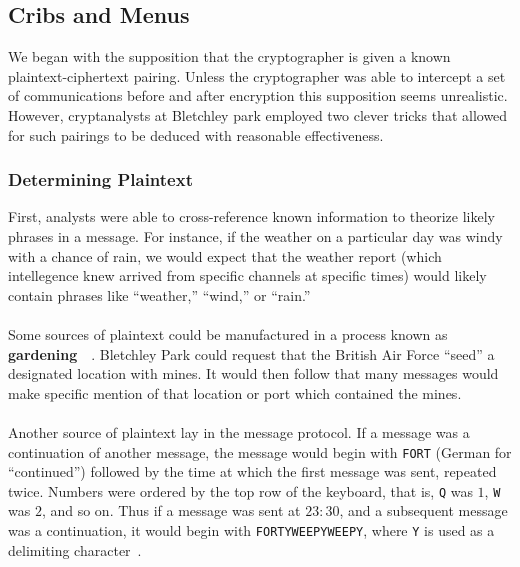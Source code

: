 \subsection{Cribs and Menus}

We began with the supposition that the
cryptographer is given a known plaintext-ciphertext pairing. Unless
the cryptographer was able to intercept
a set of communications before and after encryption this supposition
seems unrealistic. However, cryptanalysts at Bletchley park
employed two clever tricks that allowed for such pairings to be
deduced with reasonable effectiveness.
\subsubsection{Determining Plaintext}
First, analysts were able to cross-reference known information to
theorize likely phrases in a
message. For instance, if the weather on a particular day was windy
with a chance of rain, we would expect that the weather report (which
intellegence knew arrived from specific channels at specific times)
would likely contain phrases like ``weather,'' ``wind,'' or ``rain.''
\\\\Some sources of plaintext could be manufactured in a process
known as {\bf{gardening}}~\cite[p.~187]{sebag-montefiore2000enigma}~\cite[p.~144]{kahn1991seizing}. Bletchley Park could request that the
British Air Force ``seed'' a designated location with mines. It would
then follow that many messages would make specific mention of that
location or port which contained the mines.
\\\\Another source of plaintext lay in the message protocol. If a
message was a continuation of another message, the message would
begin with \texttt{FORT} (German for ``continued'') followed by the
time at which the first message was sent, repeated twice. Numbers were ordered by
the top row of the keyboard, that is, \texttt{Q} was $1$, \texttt{W}
was $2$, and so on.  Thus if a message was sent at $23:30$, and a
subsequent message was a continuation, it would begin with
\texttt{FORTYWEEPYWEEPY}, where \texttt{Y} is used as a delimiting character~\cite[pp.~278--279]{action_this_day}.
